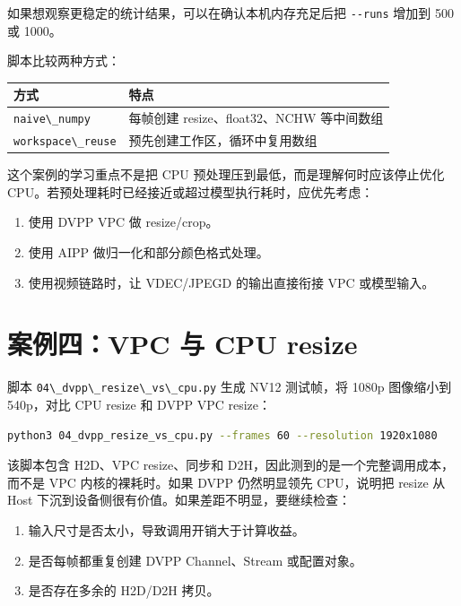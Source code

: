如果想观察更稳定的统计结果，可以在确认本机内存充足后把
\passthrough{\lstinline!--runs!} 增加到 500 或 1000。

脚本比较两种方式：

\begin{longtable}[]{@{}ll@{}}
\toprule\noalign{}
方式 & 特点 \\
\midrule\noalign{}
\endhead
\bottomrule\noalign{}
\endlastfoot
\passthrough{\lstinline!naive\_numpy!} & 每帧创建 resize、float32、NCHW
等中间数组 \\
\passthrough{\lstinline!workspace\_reuse!} &
预先创建工作区，循环中复用数组 \\
\end{longtable}

这个案例的学习重点不是把 CPU 预处理压到最低，而是理解何时应该停止优化
CPU。若预处理耗时已经接近或超过模型执行耗时，应优先考虑：

\begin{enumerate}
\def\labelenumi{\arabic{enumi}.}
\tightlist
\item
  使用 DVPP VPC 做 resize/crop。
\item
  使用 AIPP 做归一化和部分颜色格式处理。
\item
  使用视频链路时，让 VDEC/JPEGD 的输出直接衔接 VPC 或模型输入。
\end{enumerate}

\section{案例四：VPC 与 CPU resize}\label{src-book-chapter8-h12}

脚本 \passthrough{\lstinline!04\_dvpp\_resize\_vs\_cpu.py!} 生成 NV12
测试帧，将 1080p 图像缩小到 540p，对比 CPU resize 和 DVPP VPC resize：

\begin{lstlisting}[language=bash]
python3 04_dvpp_resize_vs_cpu.py --frames 60 --resolution 1920x1080
\end{lstlisting}

该脚本包含 H2D、VPC resize、同步和
D2H，因此测到的是一个完整调用成本，而不是 VPC 内核的裸耗时。如果 DVPP
仍然明显领先 CPU，说明把 resize 从 Host
下沉到设备侧很有价值。如果差距不明显，要继续检查：

\begin{enumerate}
\def\labelenumi{\arabic{enumi}.}
\tightlist
\item
  输入尺寸是否太小，导致调用开销大于计算收益。
\item
  是否每帧都重复创建 DVPP Channel、Stream 或配置对象。
\item
  是否存在多余的 H2D/D2H 拷贝。
\end{enumerate}

